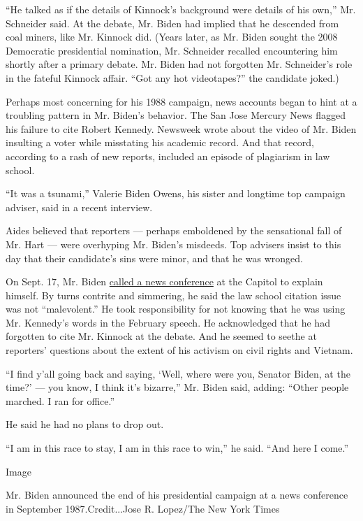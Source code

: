 ``He talked as if the details of Kinnock's background were details of
his own,'' Mr. Schneider said. At the debate, Mr. Biden had implied that
he descended from coal miners, like Mr. Kinnock did. (Years later, as
Mr. Biden sought the 2008 Democratic presidential nomination, Mr.
Schneider recalled encountering him shortly after a primary debate. Mr.
Biden had not forgotten Mr. Schneider's role in the fateful Kinnock
affair. ``Got any hot videotapes?'' the candidate joked.)

Perhaps most concerning for his 1988 campaign, news accounts began to
hint at a troubling pattern in Mr. Biden's behavior. The San Jose
Mercury News flagged his failure to cite Robert Kennedy. Newsweek wrote
about the video of Mr. Biden insulting a voter while misstating his
academic record. And that record, according to a rash of new reports,
included an episode of plagiarism in law school.

``It was a tsunami,'' Valerie Biden Owens, his sister and longtime top
campaign adviser, said in a recent interview.

Aides believed that reporters --- perhaps emboldened by the sensational
fall of Mr. Hart --- were overhyping Mr. Biden's misdeeds. Top advisers
insist to this day that their candidate's sins were minor, and that he
was wronged.

On Sept. 17, Mr. Biden
\href{https://www.nytimes.com/1987/09/18/us/biden-admits-plagiarism-in-school-but-says-it-was-not-malevolent.html}{called
a news conference} at the Capitol to explain himself. By turns contrite
and simmering, he said the law school citation issue was not
``malevolent.'' He took responsibility for not knowing that he was using
Mr. Kennedy's words in the February speech. He acknowledged that he had
forgotten to cite Mr. Kinnock at the debate. And he seemed to seethe at
reporters' questions about the extent of his activism on civil rights
and Vietnam.

``I find y'all going back and saying, `Well, where were you, Senator
Biden, at the time?' --- you know, I think it's bizarre,'' Mr. Biden
said, adding: ``Other people marched. I ran for office.''

He said he had no plans to drop out.

``I am in this race to stay, I am in this race to win,'' he said. ``And
here I come.''

Image

Mr. Biden announced the end of his presidential campaign at a news
conference in September 1987.Credit...Jose R. Lopez/The New York Times

